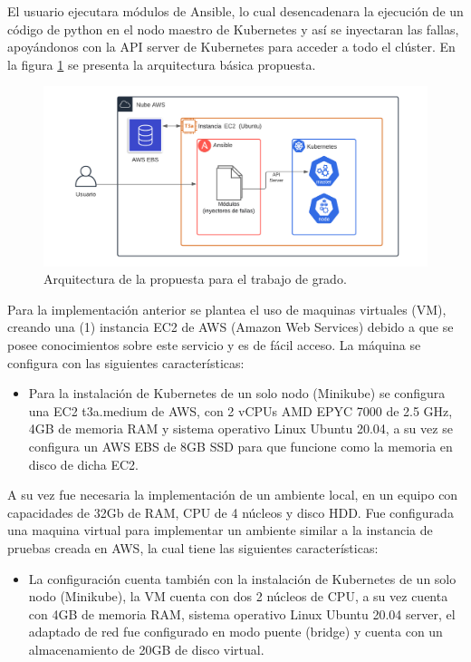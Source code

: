 \par El usuario ejecutara módulos de Ansible, lo cual
desencadenara la ejecución de un código de python en el nodo maestro de Kubernetes y así se inyectaran las fallas, apoyándonos con la API server de Kubernetes para acceder a todo el clúster. En la figura \ref{fig:arq02} se presenta la arquitectura básica propuesta.
\begin{figure}[htpb!]
	\centering
	\includegraphics[width=0.95\columnwidth]{images/arq02.png}
	\caption{Arquitectura de la propuesta para el trabajo de grado.}
	\label{fig:arq02}
\end{figure}

\par Para la implementación anterior se plantea el uso de maquinas virtuales (VM), creando %
una (1) instancia EC2 de AWS (Amazon Web Services) debido a que se posee conocimientos sobre este servicio y es de fácil acceso. La m\'aquina se configura con las siguientes características:

\begin{itemize}
    \item Para la instalación de Kubernetes de un solo nodo (Minikube) se configura una EC2 t3a.medium de AWS, con 2 vCPUs AMD EPYC 7000 de 2.5 GHz, 4GB de memoria RAM y sistema operativo Linux Ubuntu 20.04, a su vez se configura un AWS EBS de 8GB SSD para que funcione como la memoria en disco de dicha EC2.
\end{itemize}

\par A su vez fue necesaria la implementación de un ambiente local, en un equipo con capacidades de 32Gb de RAM, CPU de 4 núcleos y disco HDD. Fue configurada una maquina virtual para implementar un ambiente similar a la instancia de pruebas creada en AWS, la cual tiene las siguientes características:
\begin{itemize}
    \item La configuración cuenta también con la instalación de Kubernetes de un solo nodo (Minikube), la VM cuenta con dos 2 núcleos de CPU, a su vez cuenta con 4GB de memoria RAM, sistema operativo Linux Ubuntu 20.04 server, el adaptado de red fue configurado en modo puente (bridge) y cuenta con un almacenamiento de 20GB de disco virtual.
\end{itemize}

